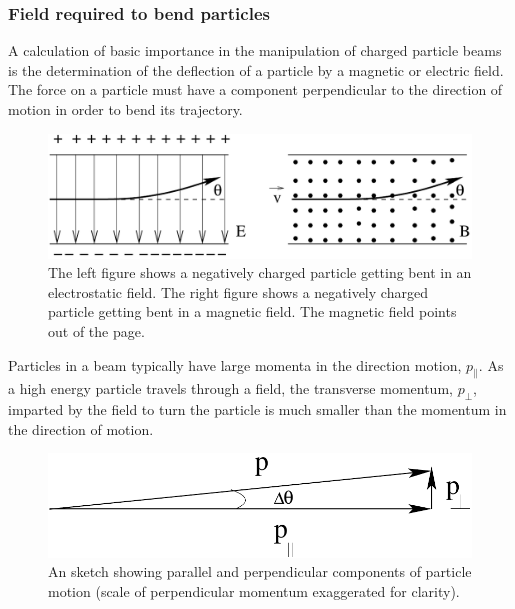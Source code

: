 \documentclass[12pt]{article}
\begin{document}
\begin{flushleft}

\subsubsection*{\color{myblue} \bf Field required to bend particles}

A calculation of basic importance in the manipulation of charged particle beams is the determination of the deflection of a particle by a magnetic or electric field.  The force on a particle must have a component 
perpendicular to the direction of motion in order to bend its trajectory.

\begin{figure}[h]
\centering
\includegraphics*[width=0.7\columnwidth]{bendit.pdf}
\caption{\small The left figure shows a negatively charged particle getting 
bent in an electrostatic field.  The right figure shows a negatively 
charged particle getting bent in a magnetic field.  The magnetic field 
points out of the page.}
\label{fig:bendit}
\end{figure}

Particles in a beam typically have large momenta in the direction motion, $p_{\parallel}$.  As a high energy particle travels through a field, the transverse momentum, $p_{\bot}$, imparted by the field to turn the 
particle is much smaller than the momentum in the direction of motion.
\begin{figure}[h]
\centering
\includegraphics*[width=0.5\columnwidth]{momvect.pdf}
\caption{An sketch showing parallel and perpendicular components of 
particle motion (scale of perpendicular momentum exaggerated for clarity).}
\label{fig:momvect}
\end{figure}


\end{flushleft}
\end{document}
